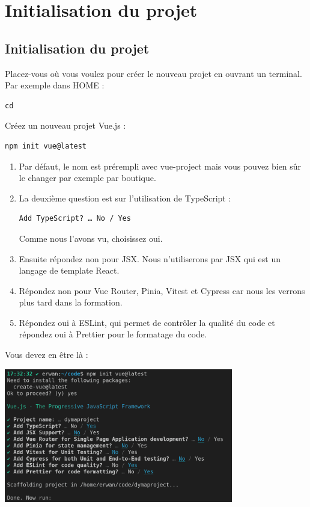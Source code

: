 \section{Initialisation du projet}
\subsection{Initialisation du projet}
Placez-vous où vous voulez pour créer le nouveau projet en ouvrant un terminal. Par exemple dans HOME :
\begin{verbatim}
cd
\end{verbatim}
Créez un nouveau projet {\color{monOrange}Vue.js} :
\begin{verbatim}
npm init vue@latest
\end{verbatim}
\begin{enumerate}
\item Par défaut, le nom est prérempli avec {\color{monOrange}vue-project} mais vous pouvez bien sûr le changer par exemple par {\color{monOrange}boutique}.
\item  La deuxième question est sur l'utilisation de {\color{monOrange}TypeScript} :
\begin{verbatim}
Add TypeScript? … No / Yes
\end{verbatim}
Comme nous l'avons vu, choisissez oui.
\item Ensuite répondez non pour JSX. Nous n'utiliserons par JSX qui est un langage de {\color{monOrange}template React}.
\item Répondez non pour {\color{monOrange}Vue Router, Pinia, Vitest} et {\color{monOrange}Cypress} car nous les verrons plus tard dans la formation.
\item Répondez oui à {\color{monOrange}ESLint}, qui permet de contrôler la qualité du code et répondez oui à {\color{monOrange}Prettier} pour le formatage du code.
\end{enumerate}

Vous devez en être là :
\begin{center}
\includegraphics[width=10cm]{images/image04.png}
\end{center}

